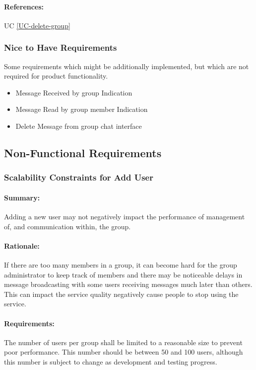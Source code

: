 \documentclass[11pt]{article}
\begin{document}
\paragraph{References:} UC \ref{UC-delete-group}

\subsubsection{Nice to Have Requirements}	\label{FR-nice-to-have}
Some requirements which might be additionally implemented, but which are not required for product functionality.
\begin{itemize}
\item Message Received by group Indication
\item Message Read by group member Indication
\item Delete Message from group chat interface
\end{itemize}

\newpage
\subsection{Non-Functional Requirements}

\subsubsection{Scalability Constraints for Add User} \label{NFR-scalability-add-member}
\paragraph{Summary:} Adding a new user may not negatively impact the performance of management of, and communication within, the group.
\paragraph{Rationale:} If there are too many members in a group, it can become hard for the group administrator to keep track of members and there may be noticeable delays in message broadcasting with some users receiving messages much later than others. This can impact the service quality negatively cause people to stop using the service.
\paragraph{Requirements:} The number of users per group shall be limited to a reasonable size to prevent poor performance. This number should be between 50 and 100 users, although this number is subject to change as development and testing progress.
\end{document}
